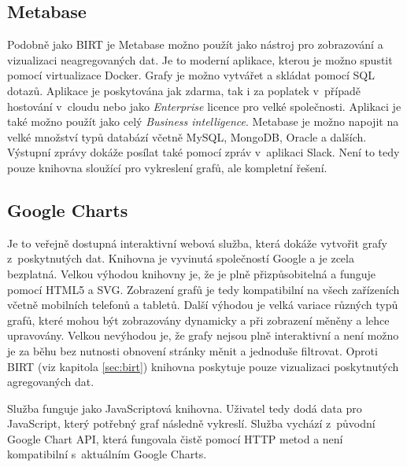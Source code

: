 \documentclass[czech,master]{diploma}
\begin{document}
\subsection{Metabase}
Podobně jako BIRT je Metabase možno použít jako nástroj pro zobrazování a vizualizaci neagregovaných dat. Je to moderní aplikace, kterou je možno spustit pomocí virtualizace Docker. Grafy je možno vytvářet a skládat pomocí SQL dotazů. Aplikace je poskytována jak zdarma, tak i za poplatek v~případě hostování v~cloudu nebo jako \textit{Enterprise} licence pro velké společnosti. Aplikaci je také možno použít jako celý \textit{Business intelligence}. Metabase je možno napojit na velké množství typů databází včetně MySQL, MongoDB, Oracle a dalších. Výstupní zprávy dokáže posílat také pomocí zpráv v~aplikaci Slack. Není to tedy pouze knihovna sloužící pro vykreslení grafů, ale kompletní řešení. \cite{ref:metabase}


\subsection{Google Charts}
\label{sec:google_charts}
Je to veřejně dostupná interaktivní webová služba, která dokáže vytvořit grafy z~poskytnutých dat. Knihovna je vyvinutá společností Google a je zcela bezplatná. Velkou výhodou knihovny je, že je plně přizpůsobitelná a funguje pomocí HTML5 a SVG. Zobrazení grafů je tedy kompatibilní na všech zařízeních včetně mobilních telefonů a tabletů. Další výhodou je velká variace různých typů grafů, které mohou být zobrazovány dynamicky a při zobrazení měněny a lehce upravovány. Velkou nevýhodou je, že grafy nejsou plně interaktivní a není možno je za běhu bez nutnosti obnovení stránky měnit a jednoduše filtrovat. Oproti BIRT (viz kapitola \ref{sec:birt}) knihovna poskytuje pouze vizualizaci poskytnutých agregovaných dat.

Služba funguje jako JavaScriptová knihovna. Uživatel tedy dodá data pro JavaScript, který potřebný graf následně vykreslí. Služba vychází z~původní Google Chart API, která fungovala čistě pomocí HTTP metod a není kompatibilní s~aktuálním Google Charts. \cite{ref:google_charts}
\end{document}
